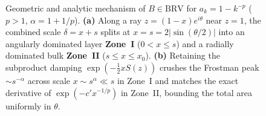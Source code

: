 \documentclass[11pt,reqno]{amsart}
\numberwithin{equation}{section}
\newcommand{\BRV}{\mathrm{BRV}}
\begin{document}
\begin{figure}[htbp]
{%
}
\caption{Geometric and analytic mechanism of $B \in \BRV$ for $a_k = 1 - k^{-p}$ ($p > 1$, $\alpha = 1 + 1/p$). \textbf{(a)} Along a ray $z = (1 - x)e^{i\theta}$ near $z = 1$, the combined scale $\delta = x + s$ splits at $x = s = 2|\sin(\theta/2)|$ into an angularly dominated layer \textbf{Zone~I} ($0 < x \le s$) and a radially dominated bulk \textbf{Zone~II} ($s \le x \le x_0$). \textbf{(b)} Retaining the subproduct damping $\exp(-\frac{1}{2}x S(z))$ crushes the Frostman peak $\sim s^{-\alpha}$ across scale $x \sim s^\alpha \ll s$ in Zone~I and matches the exact derivative of $\exp(-c' x^{-1/p})$ in Zone~II, bounding the total area uniformly in $\theta$.}
\label{fig_two_zone_brv}
\end{figure}
\end{document}
